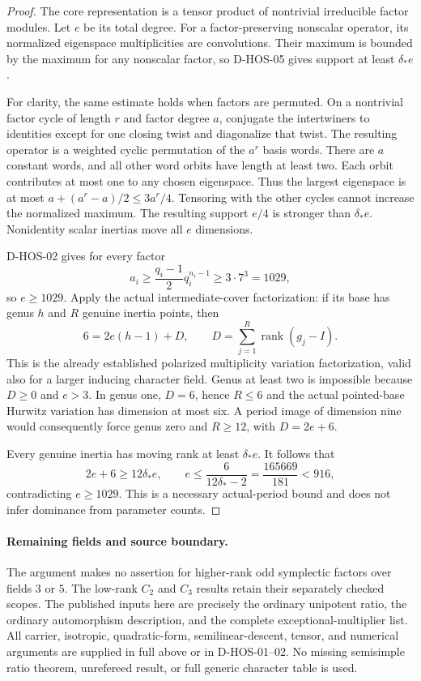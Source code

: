 \begin{proof}
The core representation is a tensor product of nontrivial irreducible
factor modules. Let $e$ be its total degree. For a factor-preserving
nonscalar operator, its normalized eigenspace multiplicities are
convolutions. Their maximum is bounded by the maximum for any
nonscalar factor, so D-HOS-05 gives support at least $\delta_*e$.

For clarity, the same estimate holds when factors are permuted.
On a nontrivial factor cycle of length $r$ and factor degree $a$,
conjugate the intertwiners to identities except for one closing
twist and diagonalize that twist. The resulting operator is a
weighted cyclic permutation of the $a^r$ basis words. There are
$a$ constant words, and all other word orbits have length at least
two. Each orbit contributes at most one to any chosen eigenspace.
Thus the largest eigenspace is at most
$a+(a^r-a)/2\le3a^r/4$. Tensoring with the other cycles cannot
increase the normalized maximum. The resulting support $e/4$
is stronger than $\delta_*e$. Nonidentity scalar inertias move
all $e$ dimensions.

D-HOS-02 gives for every factor
\[
             a_i\ge\frac{q_i-1}{2}q_i^{n_i-1}
                       \ge3\cdot7^3=1029,
\]
so $e\ge1029$. Apply the actual intermediate-cover factorization:
if its base has genus $h$ and $R$ genuine inertia points, then
\[
              6=2e(h-1)+D,\qquad
                  D=\sum_{j=1}^{R}\operatorname{rank}(g_j-I).
                                                               \tag{HOS.31}
\]
This is the already established polarized multiplicity variation
factorization, valid also for a larger inducing character field.
Genus at least two is impossible because $D\ge0$ and $e>3$.
In genus one, $D=6$, hence $R\le6$ and the actual pointed-base
Hurwitz variation has dimension at most six. A period image of
dimension nine would consequently force genus zero and
$R\ge12$, with $D=2e+6$.

Every genuine inertia has moving rank at least $\delta_*e$.
It follows that
\[
       2e+6\ge12\delta_*e,\qquad
       e\le\frac6{12\delta_*-2}
           =\frac{165669}{181}<916,                          \tag{HOS.32}
\]
contradicting $e\ge1029$. This is a necessary actual-period
bound and does not infer dominance from parameter counts.
\end{proof}

\paragraph{Remaining fields and source boundary.}
The argument makes no assertion for higher-rank odd symplectic factors
over fields $3$ or $5$. The low-rank $C_2$ and $C_3$ results retain
their separately checked scopes. The published inputs here are precisely
the ordinary unipotent ratio, the ordinary automorphism description,
and the complete exceptional-multiplier list. All carrier, isotropic,
quadratic-form, semilinear-descent, tensor, and numerical arguments
are supplied in full above or in D-HOS-01--02. No missing semisimple
ratio theorem, unrefereed result, or full generic character table is used.
